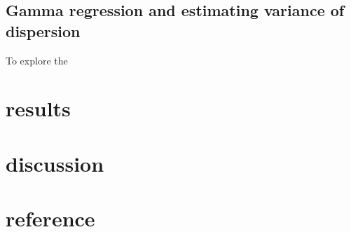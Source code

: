 \documentclass[paper=a4, fontsize=12.5pt]{scrartcl} %
\numberwithin{equation}{section} %
\numberwithin{figure}{section} %
\numberwithin{table}{section} %
\begin{document}
   \subsection{Gamma regression and estimating variance of dispersion}
   To explore the 
  \section{results}
  \section{discussion}
  \section{reference}
\end{document}
